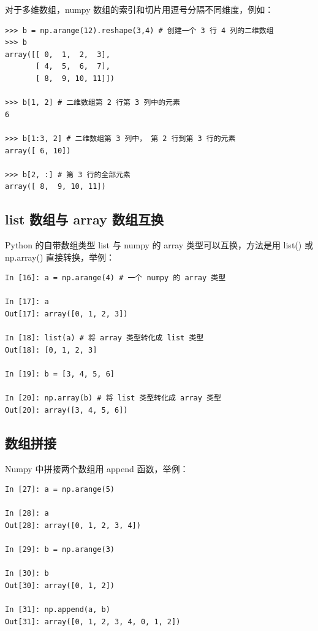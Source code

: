 对于多维数组，numpy 数组的索引和切片用逗号分隔不同维度，例如：

\begin{lstlisting}[Language=Python]
>>> b = np.arange(12).reshape(3,4) # 创建一个 3 行 4 列的二维数组
>>> b
array([[ 0,  1,  2,  3],
       [ 4,  5,  6,  7],
       [ 8,  9, 10, 11]])

>>> b[1, 2] # 二维数组第 2 行第 3 列中的元素
6

>>> b[1:3, 2] # 二维数组第 3 列中， 第 2 行到第 3 行的元素
array([ 6, 10])

>>> b[2, :] # 第 3 行的全部元素
array([ 8,  9, 10, 11])

\end{lstlisting}

\subsection{list 数组与 array 数组互换}

Python 的自带数组类型 list 与 numpy 的 array 类型可以互换，方法是用 list() 或 np.array() 直接转换，举例：

\begin{lstlisting}[Language=Python]
In [16]: a = np.arange(4) # 一个 numpy 的 array 类型

In [17]: a
Out[17]: array([0, 1, 2, 3])

In [18]: list(a) # 将 array 类型转化成 list 类型
Out[18]: [0, 1, 2, 3]

In [19]: b = [3, 4, 5, 6]

In [20]: np.array(b) # 将 list 类型转化成 array 类型
Out[20]: array([3, 4, 5, 6])
\end{lstlisting}



\subsection{数组拼接}

Numpy 中拼接两个数组用 append 函数，举例：

\begin{lstlisting}[Language=Python]
In [27]: a = np.arange(5)

In [28]: a
Out[28]: array([0, 1, 2, 3, 4])

In [29]: b = np.arange(3)

In [30]: b
Out[30]: array([0, 1, 2])

In [31]: np.append(a, b)
Out[31]: array([0, 1, 2, 3, 4, 0, 1, 2])
\end{lstlisting}

